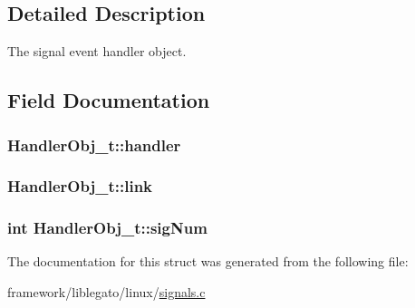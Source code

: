 \subsection{Detailed Description}
The signal event handler object. 

\subsection{Field Documentation}
\subsubsection[{\texorpdfstring{handler}{handler}}]{ Handler\+Obj\+\_\+t\+::handler}\hypertarget{struct_handler_obj__t_ae814539bf083e17491f4d13cb5bc86c5}{}\label{struct_handler_obj__t_ae814539bf083e17491f4d13cb5bc86c5}
\subsubsection[{\texorpdfstring{link}{link}}]{ Handler\+Obj\+\_\+t\+::link}\hypertarget{struct_handler_obj__t_a66e0287475c07f949184bb347c70ddbb}{}\label{struct_handler_obj__t_a66e0287475c07f949184bb347c70ddbb}
\subsubsection[{\texorpdfstring{sig\+Num}{sigNum}}]{\setlength{\rightskip}{0pt plus 5cm}int Handler\+Obj\+\_\+t\+::sig\+Num}\hypertarget{struct_handler_obj__t_a5a97b3cd363ddafc6d64269cb7eb0583}{}\label{struct_handler_obj__t_a5a97b3cd363ddafc6d64269cb7eb0583}


The documentation for this struct was generated from the following file\+:\begin{DoxyCompactItemize}
\item 
framework/liblegato/linux/\hyperlink{signals_8c}{signals.\+c}\end{DoxyCompactItemize}
